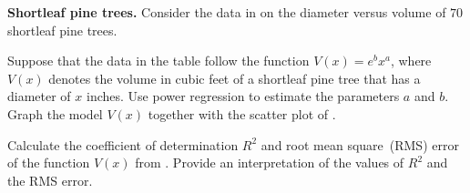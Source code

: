 \documentclass[a4paper,oneside,12pt]{article}
\begin{document}
\begin{example}
\label{eg:logarithm:shortleaf_pine_trees}
\textbf{Shortleaf pine trees.}
Consider the data in  on the diameter
versus volume of $70$ shortleaf pine trees.
\begin{packedenum}
\item\label{subeg:logarithm:shortleaf_power_regression}
  Suppose that the data in the table follow the function
  $V(x) = e^b x^a$, where $V(x)$ denotes the volume in cubic feet of a
  shortleaf pine tree that has a diameter of $x$ inches.  Use power
  regression to estimate the parameters $a$ and $b$.  Graph the model
  $V(x)$ together with the scatter plot of
  .

\item\label{subeg:logarithm:shortleaf_Pearson_r_RMS_error}
  Calculate the coefficient of determination $R^2$ and root mean
  square~(RMS) error of the function $V(x)$
  from .  Provide an
  interpretation of the values of $R^2$ and the RMS error.
\end{packedenum}
\end{example}
\end{document}
